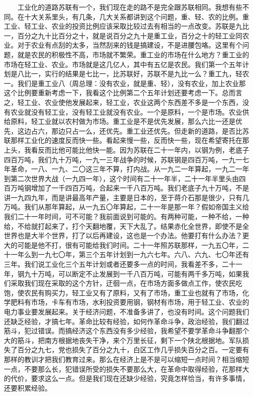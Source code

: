 \documentclass[cn,11pt,chinese]{elegantbook}
\begin{document}
　　工业化的道路苏联有一个，我们现在走的路不是完全跟苏联相同。我想有些不同。在十大关系里头，有几条，几大关系都讲到这个问题，重、轻、农的比例。重工业、轻工业、农业的投资比例应该采取比较过去有相当的一点改变。苏联是九比一，百分之九十比百分之十，就是说百分之九十是重工业，百分之十的轻工业同农业。对于农业有点刮的太多，当然刮来的钱是搞建设，不是进腰包咯。这里有个问题，就是农民的积极性不高，市场就不繁荣。重工业的市场在什么地方？重工业的市场在轻工业、农业。市场就是这几亿人，其中有五亿是农民。我们第一个五年计划是八比一，实行的结果是七比一，比苏联好，苏联不是九比一么？重工九，轻农一。我们是重工业八（周总理：没有农业，就是重、轻），没有农业，加上农业那这个比例要重新考虑一下，我看这个比例第二个五年计划还要考虑一下。总而言之，轻工业、农业使他发展起来，轻工业，农业这两个东西差不多是一个东西，没有农业就没有轻工业，没有轻工业就没有农业。一个是原料，一个是市场。农业供给原料，轻工业就以农村做为市场。重工业是不是优先发展，那么六比一还是优先，这边占六，那边只占一么，还优先。重工业还优先。但走新的道路，是否比苏联那样工业化的速度反而快一些。看起来慢一些，反而快一些，现在希望寄托在那上头，我看反而比他可能比他快一能。因为苏联在二十一年内，以钢为例，老底子四百万吨，我们九十万吨，一九一三年战争的时候，苏联钢是四百万吨，一九一七年革命，一八、一九、二〇这三年不算，打内战。从一九二一年算起，一九二一年到第二次世界大战（一九四一年），这个时间有二十一年半，二十一年半里头由四百万吨钢增加了一千四百万吨，合起来一千八百万吨。我们老底子九十万吨，不是讲一九四九年，而是讲最高年产量，主要是日本的，至于蒋介石那是很少，只有几万吨。我们从那年算起，从一九五〇年算起，二十一年是那一年？假如帝国主义给我们二十一年时间，可不可能？我前面说到可能的。有两种可能，一种不给，一种给，不给就打起来了，打个天翻地覆，天下大乱了。结果赤化全世界，即使不是全世界也是大半个世界，打了以后再建设，这也是一个办法。他要打有什么办法？更大的可能是他不打，很有可能给我们时间。二十一年照苏联那样，一九五〇年，二十一年么到一九七〇年，第三个五年计划到一九六七年。六八、六九、七〇年还有三年。我们说工业化三个五年计划或者还要多一点的时间，我看差不多，二十一年，钢九十万吨，可以断定不止发展到一千八百万吨，可能有两千多万吨，如果我们采取我们现在采取的这个方针，迂徊一点，在市场方面多做点工作，使农民吃饱，使农民有购买力，轻工业又有了原料，又有了市场，重工业也就有了市场，化学肥料有市场，卡车有市场，水利投资要用钢，钢材有市场，用于轻工业、农业的电力事业要发展起来。关于经济问题，不准备多讲了，也没有时间。这个问题我们还缺乏经验，才搞七年。革命比较有经验，如何作革命斗争，政治经验，我们翻过筋斗，犯过错误。而搞经济这个东西没有多少经验，我希望不要学革命斗争翻那个大的筋斗，把南方根据地丧失干净，来个万里长征，剩下一个陕北根据地。军队损失了百分之九七，党也损失了百分之九十，白区工作几乎损失百分之百。一定要有那样的教训才把我们教育过来。那么在经济上是不是可以缩短一点时间？相当缩短一点，不要那么长，犯错误所受的损失不要那么大，在革命中取得经验，花那样大的代价，要求这么一点。但是我们现在还缺少经验，究竟怎样恰当，有许多事情，还要积累经验。\\
\end{document}
